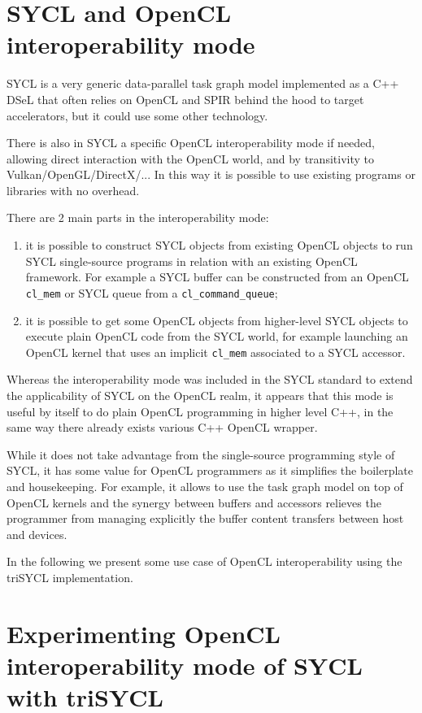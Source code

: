 \documentclass[sigplan]{acmart}
\begin{document}
\section{SYCL and OpenCL interoperability mode}
\label{sec:sycl-opencl-inter}

SYCL is a very generic data-parallel task graph model implemented as a
C++ DSeL that often relies on OpenCL and SPIR behind the hood to
target accelerators, but it could use some other technology.

There is also in SYCL a specific OpenCL interoperability mode if
needed, allowing direct interaction with the OpenCL world, and by
transitivity to Vulkan/OpenGL/DirectX/... In this way it is possible
to use existing programs or libraries with no overhead.

There are 2 main parts in the interoperability mode:
\begin{enumerate}
\item it is possible to construct SYCL objects from existing OpenCL
  objects to run SYCL single-source programs in relation with an
  existing OpenCL framework. For example a SYCL buffer can be
  constructed from an OpenCL \lstinline|cl_mem| or SYCL queue from a
  \lstinline|cl_command_queue|;
\item it is possible to get some OpenCL objects from higher-level SYCL
  objects to execute plain OpenCL code from the SYCL world, for
  example launching an OpenCL kernel that uses an implicit
  \lstinline|cl_mem| associated to a SYCL accessor.
\end{enumerate}

Whereas the interoperability mode was included in the SYCL standard to
extend the applicability of SYCL on the OpenCL realm, it appears that
this mode is useful by itself to do plain OpenCL programming in higher
level C++, in the same way there already exists various C++ OpenCL
wrapper.

While it does not take advantage from the single-source programming
style of SYCL, it has some value for OpenCL programmers as it
simplifies the boilerplate and housekeeping. For example, it allows to
use the task graph model on top of OpenCL kernels and the synergy
between buffers and accessors relieves the programmer from managing
explicitly the buffer content transfers between host and devices.

In the following we present some use case of OpenCL interoperability
using the triSYCL implementation.


\section{Experimenting OpenCL interoperability mode of SYCL with
  triSYCL}
\label{sec:exper-with-opencl}
\end{document}
